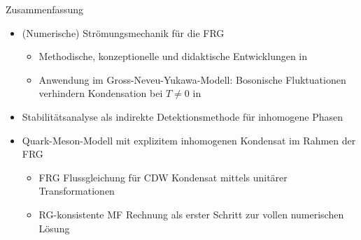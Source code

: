 \documentclass[10pt]{beamer}
\begin{document}
\begin{frame}{Zusammenfassung}
	\begin{itemize}
		\item (Numerische) Strömungsmechanik für die FRG
		\begin{itemize}
			\item Methodische, konzeptionelle und didaktische Entwicklungen in 
			\item Anwendung im Gross-Neveu-Yukawa-Modell: Bosonische Fluktuationen verhindern Kondensation bei $T\neq 0$ in 
		\end{itemize}\vspace{0.2em}
		\item Stabilitätsanalyse als indirekte Detektionsmethode für inhomogene Phasen\vspace{0.2em}
		\item Quark-Meson-Modell mit explizitem inhomogenen Kondensat im Rahmen der FRG
		\begin{itemize}
			\item FRG Flussgleichung für CDW Kondensat mittels unitärer Transformationen
			\item RG-konsistente MF Rechnung als erster Schritt zur vollen numerischen Lösung
		\end{itemize}
	\end{itemize}
	
	
\end{frame}
\end{document}
